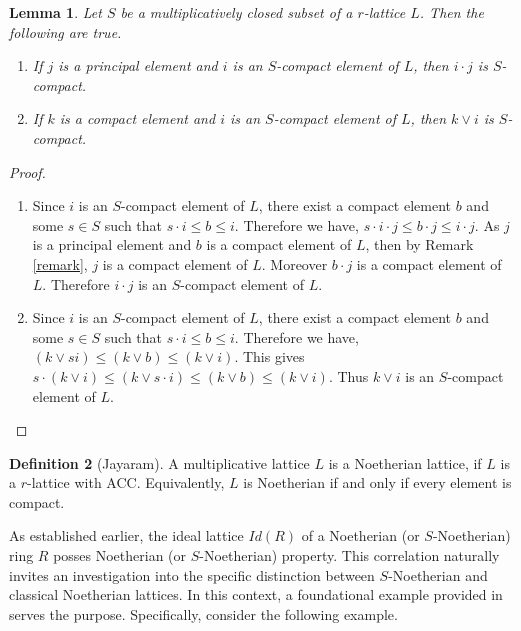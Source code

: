 \documentclass[10pt,twoside,a4]{amsart}
\numberwithin{equation}{section}
\theoremstyle{plain}
\newtheorem{lem}{Lemma}[section]
\theoremstyle{definition}
\newtheorem{definition}[lem]{Definition}
\begin{document}
\begin{lem} \label{5.51.}
	Let $S$ be a multiplicatively closed subset of a $r$-lattice $L$. Then the following are true.
	\begin{enumerate}
		\item If $j$ is a principal element and $i$ is an $S$-compact element of $L$, then $i\cdot j$ is $S$-compact.
		\item If $k$ is a compact element and $i$ is an $S$-compact element of $L$, then $k \vee i$ is $S$-compact.
	\end{enumerate}
\end{lem}

\begin{proof}
	\begin{enumerate}
		\item Since $i$ is an $S$-compact element of $L$, there exist a compact element $b$ and some $s \in S$ such that $s \cdot i \leq b \leq i$. Therefore we have, $s\cdot i \cdot j \leq b\cdot j \leq i\cdot j$. As $j$ is a principal element and $b$ is a compact element of $L$, then by Remark \ref{remark}, $j$ is a compact element of $L$. Moreover $b\cdot j$ is a compact element of $L$.  Therefore 	$i\cdot j$ is an $S$-compact element of $L$.	
		
		\item Since $i$ is an $S$-compact element of $L$, there exist a compact element $b$ and some $s \in S$ such that $s \cdot i \leq b \leq i$. Therefore we have, $(k \vee s i) \leq ( k \vee b) \leq (k \vee i)$. This gives  $s\cdot (k \vee i) \leq  (k \vee s \cdot i) \leq (k \vee b) \leq (k \vee i)$.  Thus $k \vee i$ is an $S$-compact element of $L$.\end{enumerate}\end{proof}




\begin{definition}[Jayaram\cite{JG}]
	A multiplicative lattice $L$ is a Noetherian  lattice, if $L$ is a	$r$-lattice with ACC. Equivalently, $L$ is Noetherian if and only if every element is compact.
\end{definition}

As established earlier, the ideal lattice $Id(R)$ of a Noetherian (or $S$-Noetherian) ring $R$ posses Noetherian (or $S$-Noetherian) property. This correlation naturally invites an investigation into the specific distinction between $S$-Noetherian and classical Noetherian lattices. In this context, a foundational example provided in \cite[Example 2.5]{SAK} serves the purpose. Specifically, consider the following example.
\end{document}
